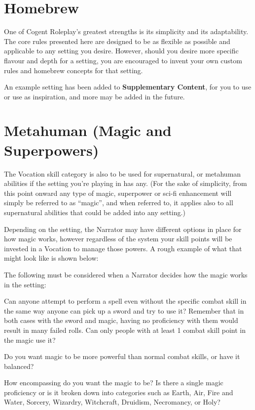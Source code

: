 \section{Homebrew}
One of Cogent Roleplay's greatest strengths is its simplicity and its adaptability. The core rules presented here are designed to be as flexible as possible and applicable to any setting you desire. However, should you desire more specific flavour and depth for a setting, you are encouraged to invent your own custom rules and homebrew concepts for that setting.

An example setting has been added to \textbf{Supplementary Content}, for you to use or use as inspiration, and more may be added in the future.

\section{Metahuman (Magic and Superpowers)}

The Vocation skill category is also to be used for supernatural, or metahuman abilities if the setting you’re playing in has any. (For the sake of simplicity, from this point onward any type of magic, superpower or sci-fi enhancement will simply be referred to as “magic”, and when referred to, it applies also to all supernatural abilities that could be added into any setting.)

Depending on the setting, the Narrator may have different options in place for how magic works, however regardless of the system your skill points will be invested in a Vocation to manage those powers. A rough example of what that might look like is shown below:

The following must be considered when a Narrator decides how the magic works in the setting:

Can anyone attempt to perform a spell even without the specific combat skill in the same way anyone can pick up a sword and try to use it? Remember that in both cases with the sword and magic, having no proficiency with them would result in many failed rolls. Can only people with at least 1 combat skill point in the magic use it?

Do you want magic to be more powerful than normal combat skills, or have it balanced? 

How encompassing do you want the magic to be? Is there a single magic proficiency or is it broken down into categories such as Earth, Air, Fire and Water, Sorcery, Wizardry, Witchcraft, Druidism, Necromancy, or Holy?


